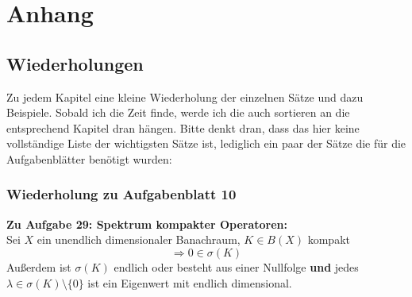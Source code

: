 
\chapter*{Anhang}  


\section*{Wiederholungen}  



Zu jedem Kapitel eine kleine Wiederholung der einzelnen Sätze und dazu Beispiele. Sobald ich die Zeit finde, werde ich die auch sortieren an die entsprechend Kapitel dran hängen. Bitte denkt dran, dass das hier keine vollständige Liste der wichtigsten Sätze ist, lediglich ein paar der Sätze die für die Aufgabenblätter benötigt wurden:	 %

\subsection*{Wiederholung zu Aufgabenblatt 10}

\textbf{Zu Aufgabe 29: Spektrum kompakter Operatoren:} \\
Sei $X$ ein unendlich dimensionaler Banachraum, $K \in B(X)$ kompakt
	\[ \Rightarrow 0 \in \sigma(K) \]
Außerdem ist $\sigma(K)$ endlich oder besteht aus einer Nullfolge \textbf{und} jedes $\lambda \in \sigma(K) \setminus \{ 0 \}$ ist ein Eigenwert mit endlich dimensional. 
~ \newline

